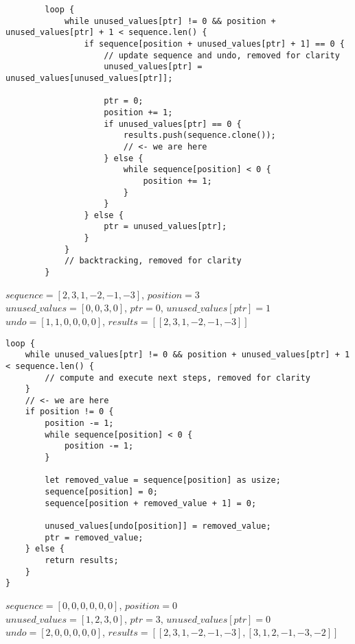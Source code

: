 \begin{frame}[fragile]
    \begin{verbatim}
        loop {
            while unused_values[ptr] != 0 && position + unused_values[ptr] + 1 < sequence.len() {
                if sequence[position + unused_values[ptr] + 1] == 0 {
                    // update sequence and undo, removed for clarity
                    unused_values[ptr] = unused_values[unused_values[ptr]];
                    
                    ptr = 0;
                    position += 1;
                    if unused_values[ptr] == 0 {
                        results.push(sequence.clone());
                        // <- we are here
                    } else {
                        while sequence[position] < 0 {
                            position += 1;
                        }
                    }
                } else {
                    ptr = unused_values[ptr];
                }
            }
            // backtracking, removed for clarity
        }
    \end{verbatim}
    $sequence = [2, 3, 1, -2, -1, -3]$, $position = 3$\\
    $unused\_values = [0, 0, 3, 0]$, $ptr = 0$, $unused\_values[ptr] = 1$\\
    $undo = [1, 1, 0, 0, 0, 0]$, $results = [[2, 3, 1, -2, -1, -3]]$
\end{frame}
\begin{frame}[fragile]
    \begin{verbatim}
loop {
    while unused_values[ptr] != 0 && position + unused_values[ptr] + 1 < sequence.len() {
        // compute and execute next steps, removed for clarity
    }
    // <- we are here
    if position != 0 {
        position -= 1;
        while sequence[position] < 0 {
            position -= 1;
        }
        
        let removed_value = sequence[position] as usize;
        sequence[position] = 0;
        sequence[position + removed_value + 1] = 0;
        
        unused_values[undo[position]] = removed_value;
        ptr = removed_value;
    } else {
        return results;
    }
}
    \end{verbatim}
    $sequence = [0, 0, 0, 0, 0, 0]$, $position = 0$\\
    $unused\_values = [1, 2, 3, 0]$, $ptr = 3$, $unused\_values[ptr] = 0$\\
    $undo = [2, 0, 0, 0, 0, 0]$, $results = [[2, 3, 1, -2, -1, -3], [3, 1, 2, -1, -3, -2]]$
\end{frame}